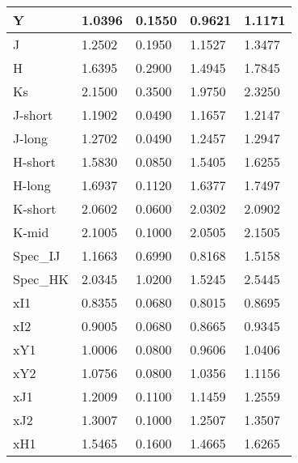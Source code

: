 \begin{longtable*}[c]{|p{0.110\DUtablewidth}|p{0.086\DUtablewidth}|p{0.086\DUtablewidth}|p{0.145\DUtablewidth}|p{0.133\DUtablewidth}|}
Y
 & 
1.0396
 & 
0.1550
 & 
0.9621
 & 
1.1171
 \\
\hline

J
 & 
1.2502
 & 
0.1950
 & 
1.1527
 & 
1.3477
 \\
\hline

H
 & 
1.6395
 & 
0.2900
 & 
1.4945
 & 
1.7845
 \\
\hline

Ks
 & 
2.1500
 & 
0.3500
 & 
1.9750
 & 
2.3250
 \\
\hline

J-short
 & 
1.1902
 & 
0.0490
 & 
1.1657
 & 
1.2147
 \\
\hline

J-long
 & 
1.2702
 & 
0.0490
 & 
1.2457
 & 
1.2947
 \\
\hline

H-short
 & 
1.5830
 & 
0.0850
 & 
1.5405
 & 
1.6255
 \\
\hline

H-long
 & 
1.6937
 & 
0.1120
 & 
1.6377
 & 
1.7497
 \\
\hline

K-short
 & 
2.0602
 & 
0.0600
 & 
2.0302
 & 
2.0902
 \\
\hline

K-mid
 & 
2.1005
 & 
0.1000
 & 
2.0505
 & 
2.1505
 \\
\hline

Spec\_IJ
 & 
1.1663
 & 
0.6990
 & 
0.8168
 & 
1.5158
 \\
\hline

Spec\_HK
 & 
2.0345
 & 
1.0200
 & 
1.5245
 & 
2.5445
 \\
\hline

xI1
 & 
0.8355
 & 
0.0680
 & 
0.8015
 & 
0.8695
 \\
\hline

xI2
 & 
0.9005
 & 
0.0680
 & 
0.8665
 & 
0.9345
 \\
\hline

xY1
 & 
1.0006
 & 
0.0800
 & 
0.9606
 & 
1.0406
 \\
\hline

xY2
 & 
1.0756
 & 
0.0800
 & 
1.0356
 & 
1.1156
 \\
\hline

xJ1
 & 
1.2009
 & 
0.1100
 & 
1.1459
 & 
1.2559
 \\
\hline

xJ2
 & 
1.3007
 & 
0.1000
 & 
1.2507
 & 
1.3507
 \\
\hline

xH1
 & 
1.5465
 & 
0.1600
 & 
1.4665
 & 
1.6265
 \\
\hline


\end{longtable*}
